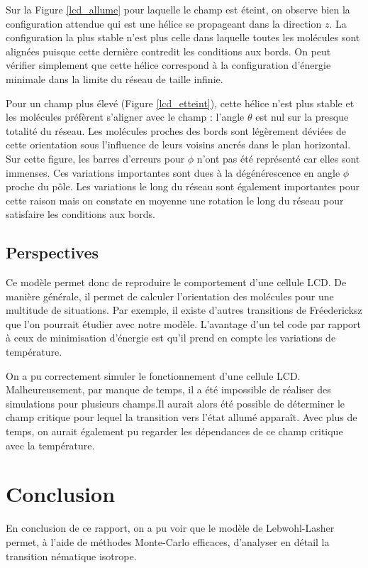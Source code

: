 \documentclass[11pt]{article}
\numberwithin{equation}{section}
\begin{document}
Sur la Figure \ref{lcd_allume} pour laquelle le champ est éteint, on observe bien la configuration attendue qui est une hélice se propageant dans la direction $z$. 
La configuration la plus stable n'est plus celle dans laquelle toutes les molécules sont alignées puisque cette dernière contredit les conditions aux bords. On peut vérifier simplement que cette hélice correspond à la configuration d'énergie minimale dans la limite du réseau de taille infinie. 
\medskip

Pour un champ plus élevé (Figure \ref{lcd_etteint}), cette hélice n'est plus stable et les molécules préfèrent s'aligner avec le champ : l'angle $\theta$ est nul sur la presque totalité du réseau. Les molécules proches des bords sont légèrement déviées de cette orientation sous l'influence de leurs voisins ancrés dans le plan horizontal. Sur cette figure, les barres d'erreurs pour $\phi$ n'ont pas été représenté car elles sont immenses. Ces variations importantes sont dues à la dégénérescence en angle $\phi$ proche du pôle. Les variations le long du réseau sont  également importantes pour cette raison mais on constate en moyenne une rotation le long du réseau pour satisfaire les conditions aux bords. 

\subsection{Perspectives}
Ce modèle permet donc de reproduire le comportement d'une cellule LCD. De manière générale, il permet de calculer l'orientation des molécules pour une multitude de situations. Par exemple, il existe d'autres transitions de Fréedericksz que l'on pourrait étudier avec notre modèle. L'avantage d'un tel code par rapport à ceux de minimisation d'énergie est qu'il prend en compte les variations de température. 
\medskip

On a pu correctement simuler le fonctionnement d'une cellule LCD. Malheureusement, par manque de temps, il a été impossible de réaliser des simulations pour plusieurs champs.Il aurait alors été possible de déterminer le champ critique pour lequel la transition vers l'état allumé apparaît. Avec plus de temps, on aurait également pu regarder les dépendances de ce champ critique avec la température.

\newpage

\section*{Conclusion}
En conclusion de ce rapport, on a pu voir que le modèle de Lebwohl-Lasher permet, à l'aide de méthodes Monte-Carlo efficaces, d'analyser en détail la transition nématique isotrope. 
\medskip
\end{document}
